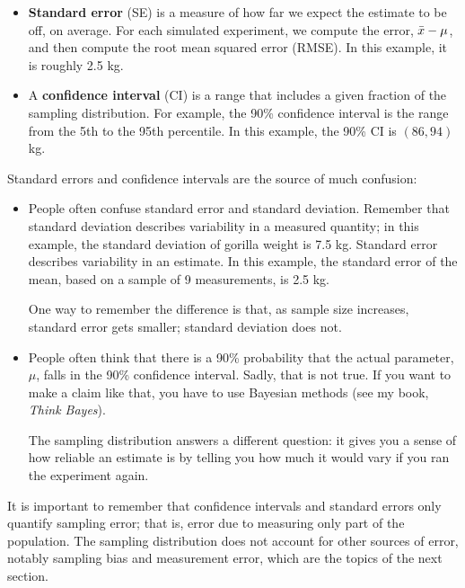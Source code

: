 \documentclass[12pt]{book}
\begin{document}
\begin{itemize}

\item {\bf Standard error} (SE) is a measure of how far we expect the
  estimate to be off, on average.  For each simulated experiment, we
  compute the error, $\bar{x} - \mu$, and then compute the root mean
  squared error (RMSE).  In this example, it is roughly 2.5 kg.

\item A {\bf confidence interval} (CI) is a range that includes a
  given fraction of the sampling distribution.  For example, the 90\%
  confidence interval is the range from the 5th to the 95th
  percentile.  In this example, the 90\% CI is $(86, 94)$ kg.

\end{itemize}

Standard errors and confidence intervals are the source of much confusion:

\begin{itemize}

\item People often confuse standard error and standard deviation.
  Remember that standard deviation describes variability in a measured
  quantity; in this example, the standard deviation of gorilla weight
  is 7.5 kg.  Standard error describes variability in an estimate.  In
  this example, the standard error of the mean, based on a sample of 9
  measurements, is 2.5 kg.

  One way to remember the difference is that, as sample size
  increases, standard error gets smaller; standard deviation does not.

\item People often think that there is a 90\% probability that the
  actual parameter, $\mu$, falls in the 90\% confidence interval.
  Sadly, that is not true.  If you want to make a claim like that, you
  have to use Bayesian methods (see my book, {\it Think Bayes}).

  The sampling distribution answers a different question: it gives you
  a sense of how reliable an estimate is by telling you how much it
  would vary if you ran the experiment again.

\end{itemize}

It is important to remember that confidence intervals
and standard errors only quantify sampling error; that is,
error due to measuring only part of the population.
The sampling distribution does not account for other
sources of error, notably sampling bias and measurement error, 
which are the topics of the next section.
\end{document}
